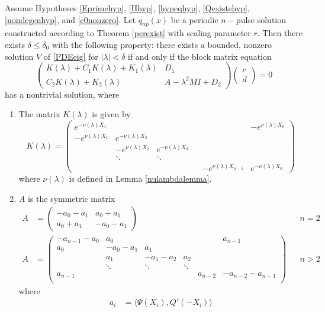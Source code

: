 \documentclass[thesis.tex]{subfiles}
\begin{document}
\begin{theorem}\label{blockmatrixtheorem}
Assume Hypotheses \ref{Eprimehyp}, \ref{Hhyp}, \ref{hypeqhyp}, \ref{Qexistshyp}, \ref{nondegenhyp}, and \ref{c0nonzero}. Let $q_{np}(x)$ be a periodic $n-$pulse solution constructed according to Theorem \ref{perexist} with scaling parameter $r$. Then there exists $\delta \leq \delta_0$ with the following property: there exists a bounded, nonzero solution $V$ of \eqref{PDEeig} for $|\lambda| < \delta$ if and only if the block matrix equation
\begin{equation}\label{blockeq}
\begin{pmatrix}
K(\lambda) + C_1 K(\lambda) + K_1(\lambda) & D_1 \\
C_2 K(\lambda) + K_2(\lambda) & A - \lambda^2 MI + D_2
\end{pmatrix}
\begin{pmatrix} c \\ d \end{pmatrix} = 0
\end{equation}
has a nontrivial solution, where 

\begin{enumerate}
\item The matrix $K(\lambda)$ is given by
\begin{equation}
K(\lambda) = 
\begin{pmatrix}
e^{-\nu(\lambda)X_1} & & & & & -e^{\nu(\lambda)X_0} \\
-e^{\nu(\lambda)X_1} & e^{-\nu(\lambda)X_2} \\
& -e^{\nu(\lambda)X_2} & e^{-\nu(\lambda)X_3} \\
& \ddots & \ddots & &&  \\
& & & & -e^{\nu(\lambda)X_{n-1}} & e^{-\nu(\lambda)X_0} 
\end{pmatrix}
\end{equation}
where $\nu(\lambda)$ is defined in Lemma \ref{nulambdalemma}.

\item $A$ is the symmetric matrix
\begin{align}\label{Asymm}
A &= \begin{pmatrix}
-a_0 -a_1 & a_0 + a_1 \\
a_0 + a_1 & -a_0 - a_1
\end{pmatrix} && n = 2 \\
A &= \begin{pmatrix}
-a_{n-1} - a_0 & a_0 & & &  & a_{n-1}\\
a_0 & -a_0 - a_1 &  a_1 \\
& a_1 & -a_1 - a_2 &  a_2 \\
& \ddots & \ddots & \ddots \\
a_{n-1} & & & & a_{n-2} & -a_{n-2} - a_{n-1} \\
\end{pmatrix} && n > 2 \nonumber
\end{align}
where
\begin{align*}
a_i &= \langle \Psi(X_i), Q'(-X_i) \rangle \\
\end{align*}


\end{enumerate}
\end{theorem}
\end{document}
